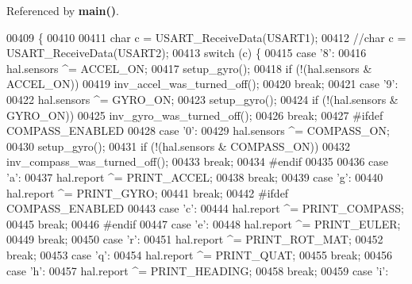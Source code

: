 Referenced by \textbf{ main()}.


\begin{DoxyCode}
00409 \{
00410   
00411     \textcolor{keywordtype}{char} c = USART_ReceiveData(USART1);
00412     \textcolor{comment}{//char c = USART\_ReceiveData(USART2);}
00413     \textcolor{keywordflow}{switch} (c) \{
00415     \textcolor{keywordflow}{case} \textcolor{charliteral}{'8'}:
00416         hal.sensors ^= ACCEL_ON;
00417         setup_gyro();
00418         \textcolor{keywordflow}{if} (!(hal.sensors & ACCEL_ON))
00419             inv\_accel\_was\_turned\_off();
00420         \textcolor{keywordflow}{break};
00421     \textcolor{keywordflow}{case} \textcolor{charliteral}{'9'}:
00422         hal.sensors ^= GYRO_ON;
00423         setup_gyro();
00424         \textcolor{keywordflow}{if} (!(hal.sensors & GYRO_ON))
00425             inv\_gyro\_was\_turned\_off();
00426         \textcolor{keywordflow}{break};
00427 \textcolor{preprocessor}{#ifdef COMPASS\_ENABLED}
00428     \textcolor{keywordflow}{case} \textcolor{charliteral}{'0'}:
00429         hal.sensors ^= COMPASS_ON;
00430         setup_gyro();
00431         \textcolor{keywordflow}{if} (!(hal.sensors & COMPASS_ON))
00432             inv\_compass\_was\_turned\_off();
00433         \textcolor{keywordflow}{break};
00434 \textcolor{preprocessor}{#endif}
00435 
00436     \textcolor{keywordflow}{case} \textcolor{charliteral}{'a'}:
00437         hal.report ^= PRINT_ACCEL;
00438         \textcolor{keywordflow}{break};
00439     \textcolor{keywordflow}{case} \textcolor{charliteral}{'g'}:
00440         hal.report ^= PRINT_GYRO;
00441         \textcolor{keywordflow}{break};
00442 \textcolor{preprocessor}{#ifdef COMPASS\_ENABLED}
00443     \textcolor{keywordflow}{case} \textcolor{charliteral}{'c'}:
00444         hal.report ^= PRINT_COMPASS;
00445         \textcolor{keywordflow}{break};
00446 \textcolor{preprocessor}{#endif}
00447     \textcolor{keywordflow}{case} \textcolor{charliteral}{'e'}:
00448         hal.report ^= PRINT_EULER;
00449         \textcolor{keywordflow}{break};
00450     \textcolor{keywordflow}{case} \textcolor{charliteral}{'r'}:
00451         hal.report ^= PRINT_ROT_MAT;
00452         \textcolor{keywordflow}{break};
00453     \textcolor{keywordflow}{case} \textcolor{charliteral}{'q'}:
00454         hal.report ^= PRINT_QUAT;
00455         \textcolor{keywordflow}{break};
00456     \textcolor{keywordflow}{case} \textcolor{charliteral}{'h'}:
00457         hal.report ^= PRINT_HEADING;
00458         \textcolor{keywordflow}{break};
00459     \textcolor{keywordflow}{case} \textcolor{charliteral}{'i'}:

\end{DoxyCode}
